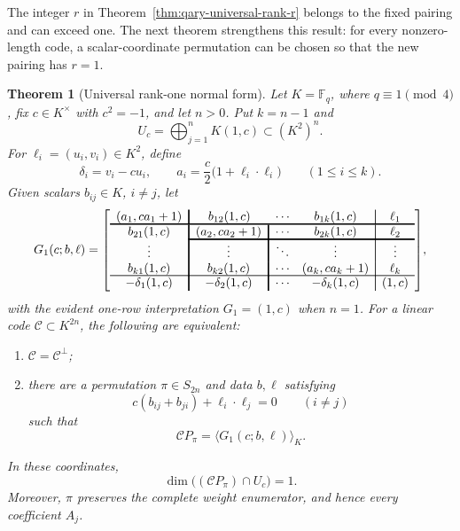 \documentclass[12pt]{article}
\newtheorem{theorem}{Theorem}[section]
\newcommand{\F}{\mathbb{F}}
\begin{document}
The integer \(r\) in Theorem~\ref{thm:qary-universal-rank-r} belongs to the
fixed pairing and can exceed one.  The next theorem strengthens this result:
for every nonzero-length code, a scalar-coordinate permutation can be chosen
so that the new pairing has \(r=1\).

\begin{theorem}[Universal rank-one normal form]\label{thm:qary-universal-rank-one}
Let \(K=\F_q\), where \(q\equiv1\pmod4\), fix \(c\in K^\times\) with
\(c^2=-1\), and let \(n>0\).  Put \(k=n-1\) and
\[
U_c=\bigoplus_{j=1}^n K(1,c)\subset(K^2)^n.
\]
For \(\ell_i=(u_i,v_i)\in K^2\), define
\[
\delta_i=v_i-cu_i,\qquad
a_i=\frac c2\bigl(1+\ell_i\cdot\ell_i\bigr)
\qquad(1\le i\le k).
\]
Given scalars \(b_{ij}\in K\), \(i\ne j\), let
\[
G_1(c;b,\ell)=
{\arrayrulewidth=1.2pt
\left[
\begin{array}{c!{\vrule width 1.2pt}c!{\vrule width 1.2pt}cc!{\vrule width 0.6pt}c}
(a_1,ca_1+1)&\multicolumn{1}{c}{b_{12}(1,c)}&\cdots&b_{1k}(1,c)&\ell_1\\[-1pt]
\noalign{\hrule height 1.2pt}
b_{21}(1,c)&(a_2,ca_2+1)&\cdots&b_{2k}(1,c)&\ell_2\\[-1pt]
\cline{2-5}
\vdots&\vdots&\ddots&\vdots&\vdots\\
b_{k1}(1,c)&b_{k2}(1,c)&\cdots&(a_k,ca_k+1)&\ell_k\\[-1pt]
\noalign{\hrule height 0.6pt}
-\delta_1(1,c)&-\delta_2(1,c)&\cdots&-\delta_k(1,c)&(1,c)
\end{array}
\right]},
\]
with the evident one-row interpretation \(G_1=(1,c)\) when \(n=1\).
For a linear code \(\mathcal C\subset K^{2n}\), the following are equivalent:
\begin{enumerate}
\item \(\mathcal C=\mathcal C^\perp\);
\item there are a permutation \(\pi\in S_{2n}\) and
data \(b,\ell\) satisfying
\begin{equation}
c(b_{ij}+b_{ji})+\ell_i\cdot\ell_j=0
\qquad(i\ne j)
\label{eq:universal-rank-one-relation}
\end{equation}
such that
\[
\mathcal C P_\pi=\langle G_1(c;b,\ell)\rangle_K.
\]
\end{enumerate}
In these coordinates,
\[
\dim\bigl((\mathcal C P_\pi)\cap U_c\bigr)=1.
\]
Moreover, \(\pi\) preserves the complete weight enumerator, and hence every
coefficient \(A_j\).
\end{theorem}
\end{document}
